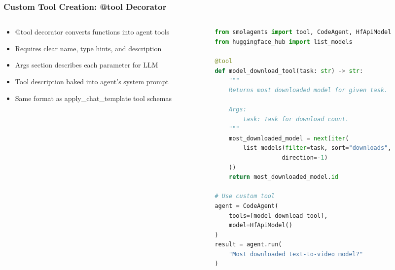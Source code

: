 \begin{frame}[fragile]\frametitle{Custom Tool Creation: @tool Decorator}
\begin{columns}
\begin{column}{0.5\textwidth}
      \begin{itemize}
	\item @tool decorator converts functions into agent tools
	\item Requires clear name, type hints, and description
	\item Args section describes each parameter for LLM
	\item Tool description baked into agent's system prompt
	\item Same format as apply\_chat\_template tool schemas
	  \end{itemize}
\end{column}
\begin{column}{0.5\textwidth}
\begin{lstlisting}[language=Python, basicstyle=\tiny]
from smolagents import tool, CodeAgent, HfApiModel
from huggingface_hub import list_models

@tool
def model_download_tool(task: str) -> str:
    """
    Returns most downloaded model for given task.
    
    Args:
        task: Task for download count.
    """
    most_downloaded_model = next(iter(
        list_models(filter=task, sort="downloads", 
                   direction=-1)
    ))
    return most_downloaded_model.id

# Use custom tool
agent = CodeAgent(
    tools=[model_download_tool], 
    model=HfApiModel()
)
result = agent.run(
    "Most downloaded text-to-video model?"
)
\end{lstlisting}
\end{column}
\end{columns}
\end{frame}

